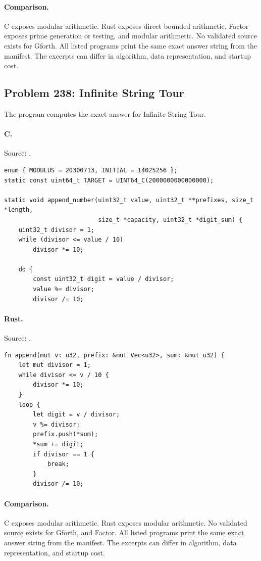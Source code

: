 \paragraph{Comparison.}
C exposes modular arithmetic. Rust exposes direct bounded arithmetic. Factor exposes prime generation or testing, and modular arithmetic.
No validated source exists for Gforth.
All listed programs print the same exact answer string from the manifest. The excerpts can differ in algorithm, data representation, and startup cost.

\subsection{Problem 238: Infinite String Tour}
\label{walkthrough:p238}
The program computes the exact answer for Infinite String Tour.

\paragraph{C.} Source: .
\begin{lstlisting}
enum { MODULUS = 20300713, INITIAL = 14025256 };
static const uint64_t TARGET = UINT64_C(2000000000000000);

static void append_number(uint32_t value, uint32_t **prefixes, size_t *length,
                          size_t *capacity, uint32_t *digit_sum) {
    uint32_t divisor = 1;
    while (divisor <= value / 10)
        divisor *= 10;

    do {
        const uint32_t digit = value / divisor;
        value %= divisor;
        divisor /= 10;
\end{lstlisting}

\paragraph{Rust.} Source: .
\begin{lstlisting}
fn append(mut v: u32, prefix: &mut Vec<u32>, sum: &mut u32) {
    let mut divisor = 1;
    while divisor <= v / 10 {
        divisor *= 10;
    }
    loop {
        let digit = v / divisor;
        v %= divisor;
        prefix.push(*sum);
        *sum += digit;
        if divisor == 1 {
            break;
        }
        divisor /= 10;
\end{lstlisting}

\paragraph{Comparison.}
C exposes modular arithmetic. Rust exposes modular arithmetic.
No validated source exists for Gforth, and Factor.
All listed programs print the same exact answer string from the manifest. The excerpts can differ in algorithm, data representation, and startup cost.

